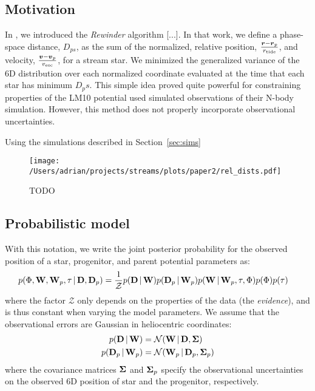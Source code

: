 \documentclass[letterpaper,12pt,preprint]{aastex}
\newcommand{\given}{\,|\,}
\newcommand{\D}{{\bf D}}
\newcommand{\W}{{\bf W}}
\newcommand{\bSigma}{{\bf \Sigma}}
\newcommand{\rtide}{r_{\rm tide}}
\newcommand{\bsr}{\boldsymbol r}
\newcommand{\bsv}{\boldsymbol v}
\begin{document}
\subsection{Motivation}
In \cite{apw13}, we introduced the \emph{Rewinder} algorithm [...]. In that work, we define a phase-space distance, $D_{ps}$, as the sum of the normalized, relative position, $\frac{\bsr-\bsr_p}{\rtide}$, and velocity, $\frac{\bsv-\bsv_p}{v_{\rm esc}}$, for a stream star. We minimized the generalized variance of the 6D distribution over each normalized coordinate evaluated at the time that each star has minimum $D_ps$. This simple idea proved quite powerful for constraining properties of the LM10 potential used simulated observations of their N-body simulation. However, this method does not properly incorporate observational uncertainties. 

Using the simulations described in Section~\ref{sec:sims}

\begin{figure}[h]
\begin{center}
\texttt{[image: /Users/adrian/projects/streams/plots/paper2/rel\_dists.pdf]}
\caption{ TODO }\label{fig:reldist}
\end{center}
\end{figure}


\subsection{Probabilistic model}
With this notation, we write the joint posterior probability for the observed position of a star, progenitor, and parent potential parameters as:
\begin{align}
	p(\Phi, \W, \W_p, \tau \given \D, \D_p) &= \frac{1}{\mathcal{Z}} p(\D \given \W) p(\D_p \given \W_p) 
												       p(\W \given \W_p, \tau, \Phi) 
												       p(\Phi) p(\tau)
\end{align}
where the factor $\mathcal{Z}$ only depends on the properties of the data (the \emph{evidence}), and is thus constant when varying the model parameters. We assume that the observational errors are Gaussian in heliocentric coordinates:
\begin{align}
	p(\D \given \W) &= \mathcal{N}(\W \given \D, \bSigma)\\
	p(\D_p \given \W_p) &= \mathcal{N}(\W_p \given \D_p, \bSigma_p)
\end{align}
where the covariance matrices $\bSigma$ and $\bSigma_p$ specify the observational uncertainties on the observed 6D position of star and the progenitor, respectively. 
\end{document}
